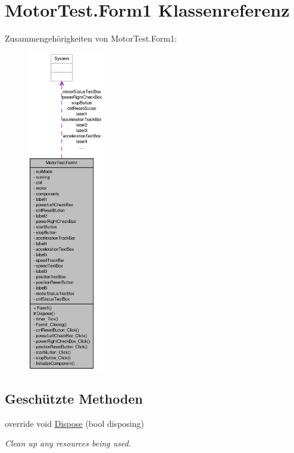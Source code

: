 \hypertarget{class_motor_test_1_1_form1}{
\section{MotorTest.Form1 Klassenreferenz}
\label{class_motor_test_1_1_form1}
}


Zusammengehörigkeiten von MotorTest.Form1:\nopagebreak
\begin{figure}[H]
\begin{center}
\leavevmode
\includegraphics[height=400pt]{class_motor_test_1_1_form1__coll__graph}
\end{center}
\end{figure}
\subsection*{Geschützte Methoden}
\begin{DoxyCompactItemize}
\item 
override void \hyperlink{class_motor_test_1_1_form1_ac013ea3d053663a5aa419e04c31e5273}{Dispose} (bool disposing)
\begin{DoxyCompactList}\small\item\em Clean up any resources being used. \item\end{DoxyCompactList}\end{DoxyCompactItemize}


